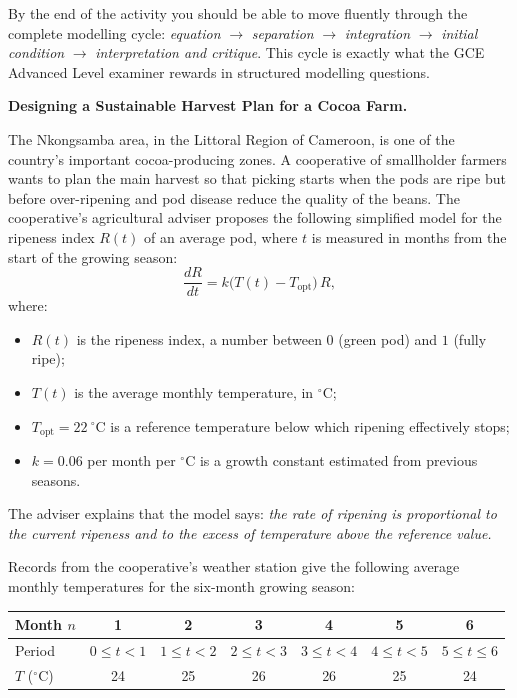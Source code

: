 \documentclass[11pt]{article}
\newcommand{\cle}[1]{{\popxbold\color{popdark}#1}}
\newcounter{popsec}
\newcounter{popsub}
\newcommand{\courssub}[1]{%
  \stepcounter{popsub}%
  \par\vspace{9pt}\noindent{\popxbold\fontsize{11.5}{13}\selectfont\color{popink}{\color{poporange}\thepopsec.\thepopsub}\hspace{6pt}#1}\par\nopagebreak\vspace{4pt}
}
\begin{document}
By the end of the activity you should be able to move fluently through the complete modelling cycle: \emph{equation} $\rightarrow$ \emph{separation} $\rightarrow$ \emph{integration} $\rightarrow$ \emph{initial condition} $\rightarrow$ \emph{interpretation and critique}. This cycle is exactly what the GCE Advanced Level examiner rewards in structured modelling questions.

\courssub{Situation}

\textbf{Designing a Sustainable Harvest Plan for a Cocoa Farm.}\par
\medskip
The Nkongsamba area, in the Littoral Region of Cameroon, is one of the country's important cocoa-producing zones. A cooperative of smallholder farmers wants to plan the main harvest so that picking starts when the pods are ripe but before over-ripening and pod disease reduce the quality of the beans. The cooperative's agricultural adviser proposes the following simplified model for the \cle{ripeness index} $R(t)$ of an average pod, where $t$ is measured in months from the start of the growing season:
\[
\frac{dR}{dt}=k\bigl(T(t)-T_{\mathrm{opt}}\bigr)\,R,
\]
where:
\begin{itemize}
\item $R(t)$ is the ripeness index, a number between $0$ (green pod) and $1$ (fully ripe);
\item $T(t)$ is the average monthly temperature, in ${}^{\circ}$C;
\item $T_{\mathrm{opt}}=22\ {}^{\circ}$C is a reference temperature below which ripening effectively stops;
\item $k=0.06$ per month per ${}^{\circ}$C is a growth constant estimated from previous seasons.
\end{itemize}

The adviser explains that the model says: \emph{the rate of ripening is proportional to the current ripeness and to the excess of temperature above the reference value.}

Records from the cooperative's weather station give the following average monthly temperatures for the six-month growing season:

\begin{center}
\begin{tabular}{|l|c|c|c|c|c|c|}
\hline
\rowcolor{popblueL} Month $n$ & 1 & 2 & 3 & 4 & 5 & 6 \\
\hline Period & $0\le t<1$ & $1\le t<2$ & $2\le t<3$ & $3\le t<4$ & $4\le t<5$ & $5\le t\le 6$ \\
\hline $T$ (${}^{\circ}$C) & 24 & 25 & 26 & 26 & 25 & 24 \\
\hline
\end{tabular}
\end{center}
\end{document}
